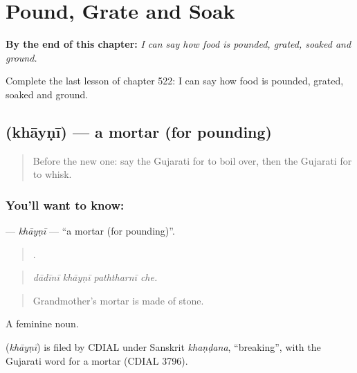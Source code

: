 
\chapter{Pound, Grate and Soak}
\label{ch:gu-pound-grate-and-soak}

\begin{chapteropening}
\textbf{By the end of this chapter:} \emph{I can say how food is pounded, grated, soaked and ground.}

Complete the last lesson of chapter 522: I can say how food is pounded, grated, soaked and ground.
\end{chapteropening}

\section[\texorpdfstring{\gu{ખાયણી} (khāyṇī)}{ખાયણી (khāyṇī)}]{ (khāyṇī) — a mortar (for pounding)}

\label{lesson:GU-C522-khayni}



\begin{quote}
Before the new one: say the Gujarati for to boil over, then the Gujarati for to whisk.
\end{quote}

\subsection*{You'll want to know: }
\textbf{} — \emph{khāyṇī} — \textquotedblleft{}a mortar (for pounding)\textquotedblright{}.

\begin{quote}
   .
\end{quote}

\begin{quote}
\emph{dādīnī khāyṇī paththarnī che.}
\end{quote}

\begin{quote}
Grandmother's mortar is made of stone.
\end{quote}

A feminine noun.

\begin{cousinweb}
\textbf{} (\emph{khāyṇī}) is filed by CDIAL under Sanskrit \emph{khaṇḍana}, \textquotedblleft{}breaking\textquotedblright{}, with the Gujarati word for a mortar (CDIAL 3796).
\end{cousinweb}

